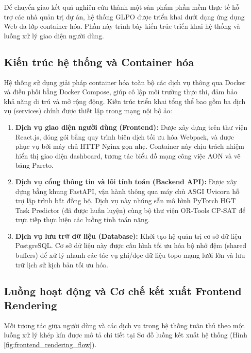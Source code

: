 Để chuyển giao kết quả nghiên cứu thành một sản phẩm phần mềm thực tế hỗ trợ các nhà quản trị dự án, hệ thống GLPO được triển khai dưới dạng ứng dụng Web đa lớp container hóa. Phần này trình bày kiến trúc triển khai hệ thống và luồng xử lý giao diện người dùng.

\subsection{Kiến trúc hệ thống và Container hóa}
Hệ thống sử dụng giải pháp container hóa toàn bộ các dịch vụ thông qua Docker và điều phối bằng Docker Compose, giúp cô lập môi trường thực thi, đảm bảo khả năng di trú và mở rộng động. Kiến trúc triển khai tổng thể bao gồm ba dịch vụ (services) chính được thiết lập trong mạng nội bộ ảo:

\begin{enumerate}
    \item \textbf{Dịch vụ giao diện người dùng (Frontend):}
    Được xây dựng trên thư viện React.js, đóng gói bằng quy trình biên dịch tối ưu hóa Webpack, và được phục vụ bởi máy chủ HTTP Nginx gọn nhẹ. Container này chịu trách nhiệm hiển thị giao diện dashboard, tương tác biểu đồ mạng công việc AON và vẽ bảng Pareto.
    
    \item \textbf{Dịch vụ cổng thông tin và lõi tính toán (Backend API):}
    Được xây dựng bằng khung FastAPI, vận hành thông qua máy chủ ASGI Uvicorn hỗ trợ lập trình bất đồng bộ. Dịch vụ này nhúng sẵn mô hình PyTorch HGT Task Predictor (đã được huấn luyện) cùng bộ thư viện OR-Tools CP-SAT để trực tiếp thực hiện các luồng tính toán nặng.
    
    \item \textbf{Dịch vụ lưu trữ dữ liệu (Database):}
    Khởi tạo hệ quản trị cơ sở dữ liệu PostgreSQL. Cơ sở dữ liệu này được cấu hình tối ưu hóa bộ nhớ đệm (shared buffers) để xử lý nhanh các tác vụ ghi/đọc dữ liệu topo mạng lưới lớn và lưu trữ lịch sử kịch bản tối ưu hóa.
\end{enumerate}

\subsection{Luồng hoạt động và Cơ chế kết xuất Frontend Rendering}
Mối tương tác giữa người dùng và các dịch vụ trong hệ thống tuân thủ theo một luồng xử lý khép kín được mô tả chi tiết tại Sơ đồ luồng kết xuất hệ thống (Hình \ref{fig:frontend_rendering_flow}).

